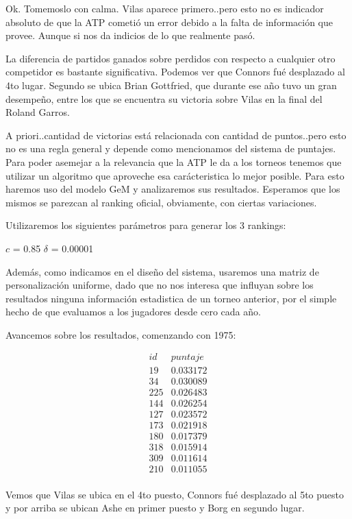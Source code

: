 Ok. Tomemoslo con calma. Vilas aparece primero..pero esto no es indicador absoluto de que la ATP cometió un error debido a la falta de información que provee. Aunque si nos da indicios de lo que realmente pasó.

La diferencia de partidos ganados sobre perdidos con respecto a cualquier otro competidor es bastante significativa. Podemos ver que Connors fué desplazado al 4to lugar. Segundo se ubica Brian Gottfried, que durante ese año tuvo un gran desempeño, entre los que se encuentra su victoria sobre Vilas en la final del Roland Garros. 

A priori..cantidad de victorias está relacionada con cantidad de puntos..pero esto no es una regla general y depende como mencionamos del sistema de puntajes. Para poder asemejar a la relevancia que la ATP le da a los torneos tenemos que utilizar un algoritmo que aproveche esa carácteristica lo mejor posible. Para esto haremos uso del modelo GeM y analizaremos sus resultados. Esperamos que los mismos se parezcan al ranking oficial, obviamente, con ciertas variaciones.

Utilizaremos los siguientes parámetros para generar los 3 rankings:

$c$ = 0.85
$\delta$ = 0.00001

Además, como indicamos en el diseño del sistema, usaremos una matriz de personalización uniforme, dado que no nos interesa que influyan sobre los resultados ninguna información estadistica de un torneo anterior, por el simple hecho de que evaluamos a los jugadores desde cero cada año.

Avancemos sobre los resultados, comenzando con 1975:

\begin{eqnarray*}
id & puntaje \\
19 & 0.033172 \\
34 & 0.030089 \\
225 & 0.026483 \\
144 & 0.026254 \\
127 & 0.023572 \\
173 & 0.021918 \\
180 & 0.017379 \\
318 & 0.015914 \\
309 & 0.011614 \\
210 & 0.011055 \\
\end{eqnarray*}

Vemos que Vilas se ubica en el 4to puesto, Connors fué desplazado al 5to puesto y por arriba se ubican Ashe en primer puesto y Borg en segundo lugar. 

